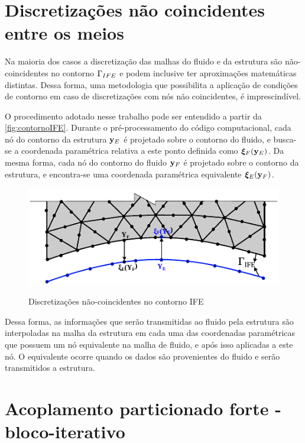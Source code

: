 \section{Discretizações não coincidentes entre os meios}

Na maioria dos casos a discretização das malhas do fluido e da estrutura são não-coincidentes no contorno $\Gamma_{IFE}$ e podem inclusive ter aproximações matemáticas distintas. Dessa forma, uma metodologia que possibilita a aplicação de condições de contorno em caso de discretizações com nós não coincidentes, é imprescindível. 

O procedimento adotado nesse trabalho pode ser entendido a partir da \autoref{fig:contornoIFE}. Durante o pré-processamento do código computacional, cada nó do contorno da estrutura $\mathbf{y}_E$ é projetado sobre o contorno do fluido, e busca-se a coordenada paramétrica relativa a este ponto definida como $\boldsymbol{\xi}_F (\mathbf{y}_E)$. Da mesma forma, cada nó do contorno do fluido $\mathbf{y}_F$ é projetado sobre o contorno da estrutura, e encontra-se uma coordenada paramétrica equivalente $\boldsymbol{\xi}_E(\mathbf{y}_F)$. 

\begin{figure}[!htbp]
	\caption{Discretizações não-coincidentes no contorno IFE}
	\centering 
	\includegraphics[scale=1.5,trim=0cm 0cm 0cm 0cm, clip=true]{Imagens/Cap7/contornoIFE.pdf}	
	\label{fig:contornoIFE}
\end{figure}

Dessa forma, as informações que serão transmitidas ao fluido pela estrutura são interpoladas na malha da estrutura em cada uma das coordenadas paramétricas que possuem um nó equivalente na malha de fluido, e após isso aplicadas a este nó. O equivalente ocorre quando os dados são provenientes do fluido e serão transmitidos a estrutura.

\section{Acoplamento particionado forte - bloco-iterativo}

